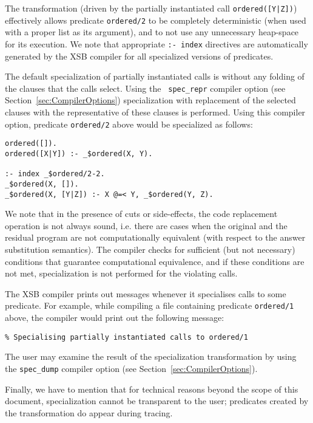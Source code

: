 The transformation (driven by the partially instantiated call
{\tt ordered([Y|Z])}) effectively allows predicate {\tt ordered/2}
to be completely deterministic (when used with a proper list as its
argument), and to not use any unnecessary heap-space for its
execution.  We note that appropriate {\tt :- index} directives are
automatically generated by the XSB compiler for all specialized
versions of predicates.

The default specialization of partially instantiated calls is without
any folding of the clauses that the calls select.  Using the {\tt
spec\_repr} compiler option (see Section~\ref{sec:CompilerOptions})
specialization with replacement of the selected clauses with the
representative of these clauses is performed.  Using this compiler
option, predicate {\tt ordered/2} above would be specialized as follows:
\begin{center}
\begin{minipage}{4.1in}
\begin{verbatim}
ordered([]).
ordered([X|Y]) :- _$ordered(X, Y).

:- index _$ordered/2-2.
_$ordered(X, []).
_$ordered(X, [Y|Z]) :- X @=< Y, _$ordered(Y, Z).
\end{verbatim}
\end{minipage}
\end{center}
We note that in the presence of cuts or side-effects, the code
replacement operation is not always sound, i.e.  there are cases when
the original and the residual program are not computationally equivalent
(with respect to the answer substitution semantics).  The compiler
checks for sufficient (but not necessary) conditions that guarantee
computational equivalence, and if these conditions are not met,
specialization is not performed for the violating calls.

The XSB compiler prints out messages whenever it specialises
calls to some predicate.  For example, while compiling a file
containing predicate {\tt ordered/1} above, the compiler would print
out the following message:
\begin{center}
{\tt	\% Specialising partially instantiated calls to ordered/1}
\end{center}
The user may examine the result of the specialization transformation
by using the {\tt spec\_dump} compiler option
(see Section~\ref{sec:CompilerOptions}).

Finally, we have to mention that for technical reasons beyond the scope of
this document, specialization cannot be transparent to the user; predicates
created by the transformation do appear during tracing.


